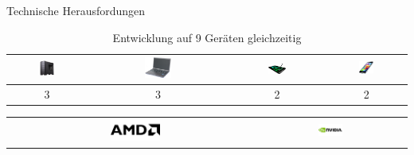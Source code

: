 \begin{frame}{Technische Herausfordungen}
\onetoone
{
	\begin{table}[h]
	\begin{tabular}{c|c|c|c}
		\includegraphics[width=0.2\textwidth, height=0.1\textheight, keepaspectratio]{images/tower} &
		\includegraphics[width=0.2\textwidth, height=0.1\textheight, keepaspectratio]{images/laptops} &
		\includegraphics[width=0.2\textwidth, height=0.1\textheight, keepaspectratio]{images/tablets} & 
		\includegraphics[width=0.2\textwidth, height=0.1\textheight, keepaspectratio]{images/smartphones} \\ \hline
		3 & 3 & 2 & 2
	\end{tabular}
	\caption{Entwicklung auf 9 Geräten gleichzeitig}
	\end{table}
}
{
	\begin{table}[h]
	\begin{tabular}{c|c|c}
		\includegraphics[width=0.2\textwidth, height=0.1\textheight, keepaspectratio]{images/AMD_Logo} &
		\includegraphics[width=0.2\textwidth, height=0.1\textheight, keepaspectratio]{images/nvidia-logo} &

\end{tabular}
\end{table}}
\end{frame}
